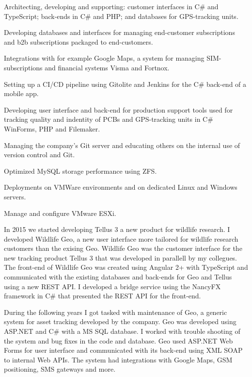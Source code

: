 \documentclass{cv-stylish}
\begin{document}
\begin{center}
\begin{adjustwidth}{0.015\linewidth}{0.015\linewidth}
\begin{compactitem}
  \item Architecting, developing and supporting: customer interfaces in
    C\# and TypeScript; back-ends in C\# and PHP; and databases for
    GPS-tracking units.
  \item Developing databases and interfaces for managing end-customer
    subscriptions and b2b subscriptions packaged to end-customers.
  \item Integrations with for example Google Maps, a system for managing
    SIM-subscriptions and financial systems Visma and Fortnox.
  \item Setting up a CI/CD pipeline using Gitolite and Jenkins for the C\#
    back-end of a mobile app.
  \item Developing user interface and back-end for production support
    tools used for tracking quality and indentity of PCBs and GPS-tracking
    units in C\# WinForms, PHP and Filemaker.
  \item Managing the company's Git server and educating others on the
    internal use of version control and Git.
  \item Optimized MySQL storage performance using ZFS.
  \item Deployments on VMWare environments and on dedicated Linux and
    Windows servers.
  \item Manage and configure VMware ESXi.
\end{compactitem}

In 2015 we started developing Tellus 3 a new product for wildlife
research. I developed Wildlife Geo, a new user interface more tailored
for wildlife research customers than the exising Geo.
Wildlife Geo was the customer interface for the new tracking product
Tellus 3 that was developed in parallell by my collegues.
The front-end of Wildlife Geo was created using Angular 2+ with
TypeScript and communicated with the existing databases and back-ends
for Geo and Tellus using a new REST API. I developed a bridge service
using the NancyFX framework in C\# that presented the REST API for the
front-end.

During the following years I got tasked with maintenance of Geo, a
generic system for asset tracking developed by the company.
Geo was developed using ASP.NET and C\# with a MS SQL database.
I worked with trouble shooting of the system and bug fixes in the code
and database.
Geo used ASP.NET Web Forms for user interface and communicated with
its back-end using XML SOAP to internal Web APIs. The system had
integrations with Google Maps, GSM positioning, SMS gateways and
more.


\end{adjustwidth}
\end{center}
\end{document}
